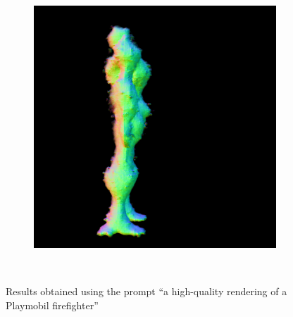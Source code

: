 \begin{figure}[ht]
\begin{subfigure}[b]{0.222\textwidth}
        \caption{}
    \end{subfigure}
    \begin{subfigure}[b]{0.222\textwidth}
        \centering
        \fontsize{9pt}{7pt}\selectfont{}\vspace{.1cm}
        \includegraphics[width=\textwidth]{etc/a robot made out of plants/magic123/magic123_coarse_robot_right_10000_part2.png}
        \caption{}
    \end{subfigure}
    \caption{Results obtained using the prompt ``a high-quality rendering of a Playmobil firefighter''}~\label{fig:resultPlaymobil}
\end{figure}

